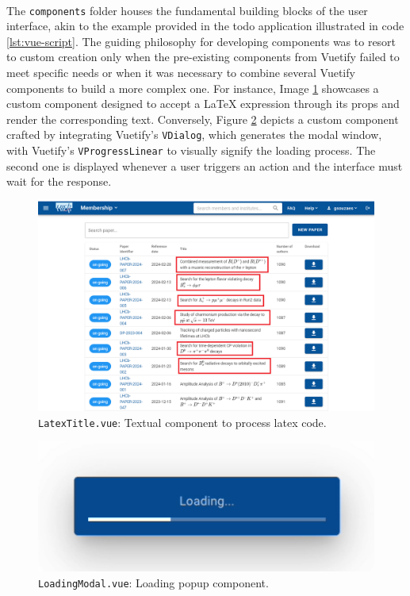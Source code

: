 \paragraph{} The \verb|components| folder houses the fundamental building blocks of the user interface, akin to the example provided in the todo application illustrated in code \ref{lst:vue-script}. The guiding philosophy for developing components was to resort to custom creation only when the pre-existing components from Vuetify failed to meet specific needs or when it was necessary to combine several Vuetify components to build a more complex one. For instance, Image \ref{fig:tcc_latex_title} showcases a custom component designed to accept a LaTeX expression through its props and render the corresponding text. Conversely, Figure \ref{fig:tcc_loading} depicts a custom component crafted by integrating Vuetify's \verb|VDialog|, which generates the modal window, with Vuetify's \verb|VProgressLinear| to visually signify the loading process. The second one is displayed whenever a user triggers an action and the interface must wait for the response.


\begin{figure}[H]
    \centering
    \includegraphics[width=0.9\linewidth]{figuras/tcc_authorship_home.png}
    \caption{\texttt{LatexTitle.vue}: Textual component to process latex code.}
    \label{fig:tcc_latex_title}
\end{figure}


\begin{figure}[H]
    \centering
    \includegraphics[width=0.5\linewidth]{figuras/tcc_loading.png}
    \caption{\texttt{LoadingModal.vue}: Loading popup component.}
    \label{fig:tcc_loading}
\end{figure}

